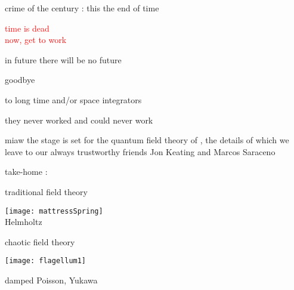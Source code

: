 \begin{frame}{crime of the century : this the end of time}
\begin{center}
\textcolor{red}{{\huge time is dead}
    \\
{now, get to work}}
\end{center}
\end{frame} %

\begin{frame}{in future there will be no future}
\begin{center}
{\huge goodbye}
\end{center}

\vfill

to long time and/or space integrators

\medskip

\hfill they never worked and could never work
\end{frame} %

\begin{frame}{miaw}
\vfill
the stage is set for the quantum field theory of \catlatt, the details of
which we leave to our always trustworthy
friends Jon Keating and Marcos Saraceno
\end{frame} %

\begin{frame}{take-home :   }
\begin{center}
            \begin{minipage}[c]{0.40\textwidth}\begin{center}
traditional field theory
\bigskip

\texttt{[image: mattressSpring]}\\
{\color{blue}Helmholtz}
            \end{center}\end{minipage}
            \hspace{2ex}
            \begin{minipage}[c]{0.46\textwidth}\begin{center}
chaotic field theory\\
\bigskip
\bigskip
\bigskip

\texttt{[image: flagellum1]}\\
\bigskip

damped {\color{blue}Poisson},  {\color{blue}Yukawa}
            \end{center}\end{minipage}
\end{center}
\end{frame} %

